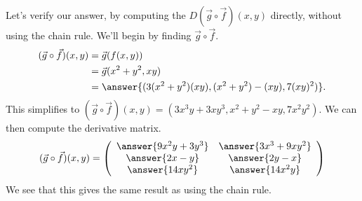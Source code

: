 \documentclass{ximera}
\begin{document}
\begin{example}
Let's verify our answer, by computing the $D(\vec{g}\circ\vec{f})(x,y)$ directly, without using the chain rule. We'll begin by finding $\vec{g}\circ\vec{f}$.
\begin{align*}
(\vec{g}\circ\vec{f})(x,y) &= \vec{g}(f(x,y))\\
&= \vec{g}(x^2+y^2,xy)\\
&= \answer{(3(x^2+y^2)(xy),(x^2+y^2)-(xy),7(xy)^2)}.
\end{align*}
This simplifies to $(\vec{g}\circ\vec{f})(x,y) = (3x^3y+3xy^3, x^2+y^2-xy,7x^2y^2)$. We can then compute the derivative matrix.
\[
(\vec{g}\circ\vec{f})(x,y) =  \left(\begin{array}{cc}\answer{9x^2y+3y^3} & \answer{3x^3+9xy^2}\\\answer{2x-y} & \answer{2y-x}\\\answer{14xy^2} & \answer{14x^2y}\end{array}\right)
\]
We see that this gives the same result as using the chain rule.
\end{example}
\end{document}
